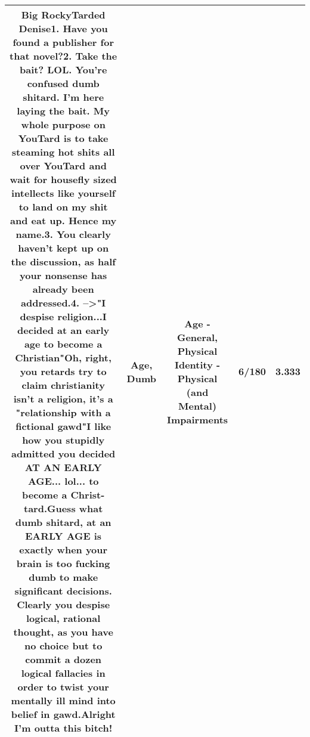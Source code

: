 \documentclass[11pt]{article}
\newlength\mylength
\begin{document}
\begin{center}
\begin{longtable}{|C{.65\mylength}|C{.30\mylength}|C{.12\mylength}|C{.12\mylength}|C{.12\mylength}|}
  \small Big RockyTarded Denise1. Have you found a publisher for that novel?2. Take the bait?  LOL.  You're confused \textbf{dumb} shitard.  I'm here laying the bait.  My whole purpose on YouTard is to take steaming hot shits all over YouTard and wait for housefly sized intellects like yourself to land on my shit and eat up.  Hence my name.3. You clearly haven't kept up on the discussion, as half your nonsense has already been addressed.4. -->"I despise religion...I decided at an early \textbf{age} to become a Christian"Oh, right, you retards try to claim christianity isn't a religion, it's a "relationship with a fictional gawd"I like how you stupidly admitted you decided AT AN EARLY \textbf{AGE}... lol... to become a Christ-tard.Guess what \textbf{dumb} shitard, at an EARLY \textbf{AGE} is exactly when your brain is too fucking \textbf{dumb} to make significant decisions.  Clearly you despise logical, rational thought, as you have no choice but to commit a dozen logical fallacies in order to twist your mentally ill mind into belief in gawd.Alright I'm outta this bitch!\normalsize   & Age, Dumb & Age - General, Physical Identity - Physical (and Mental) Impairments & 6/180 & 3.333 \\  \hline

\end{longtable}
\end{center}
\end{document}
